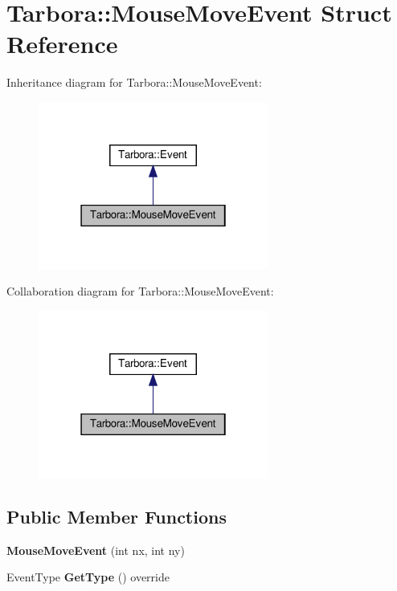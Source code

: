 \hypertarget{structTarbora_1_1MouseMoveEvent}{}\section{Tarbora\+:\+:Mouse\+Move\+Event Struct Reference}
\label{structTarbora_1_1MouseMoveEvent}


Inheritance diagram for Tarbora\+:\+:Mouse\+Move\+Event\+:\nopagebreak
\begin{figure}[H]
\begin{center}
\leavevmode
\includegraphics[width=214pt]{structTarbora_1_1MouseMoveEvent__inherit__graph}
\end{center}
\end{figure}


Collaboration diagram for Tarbora\+:\+:Mouse\+Move\+Event\+:\nopagebreak
\begin{figure}[H]
\begin{center}
\leavevmode
\includegraphics[width=214pt]{structTarbora_1_1MouseMoveEvent__coll__graph}
\end{center}
\end{figure}
\subsection*{Public Member Functions}
\begin{DoxyCompactItemize}
\item 
\mbox{\label{structTarbora_1_1MouseMoveEvent_aea0fff14a171cfd633df517082629f60}} 
{\bfseries Mouse\+Move\+Event} (int nx, int ny)
\item 
\mbox{\label{structTarbora_1_1MouseMoveEvent_ae8f49edde87f46697ad153aebdd92e63}} 
Event\+Type {\bfseries Get\+Type} () override
\end{DoxyCompactItemize}
